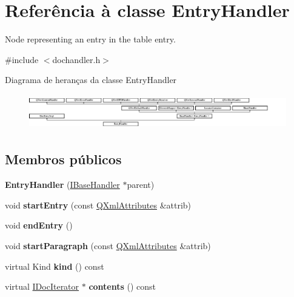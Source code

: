 \hypertarget{class_entry_handler}{\section{Referência à classe Entry\-Handler}
\label{class_entry_handler}
}


Node representing an entry in the table entry.  




{\ttfamily \#include $<$dochandler.\-h$>$}

Diagrama de heranças da classe Entry\-Handler\begin{figure}[H]
\begin{center}
\leavevmode
\includegraphics[height=1.545894cm]{class_entry_handler}
\end{center}
\end{figure}
\subsection*{Membros públicos}
\begin{DoxyCompactItemize}
\item 
\hypertarget{class_entry_handler_acb087cca1ea9e2026162c18aa7c028ca}{{\bfseries Entry\-Handler} (\hyperlink{class_i_base_handler}{I\-Base\-Handler} $\ast$parent)}\label{class_entry_handler_acb087cca1ea9e2026162c18aa7c028ca}

\item 
\hypertarget{class_entry_handler_ac235cd02462379ae5f73c64fa4141c50}{void {\bfseries start\-Entry} (const \hyperlink{class_q_xml_attributes}{Q\-Xml\-Attributes} \&attrib)}\label{class_entry_handler_ac235cd02462379ae5f73c64fa4141c50}

\item 
\hypertarget{class_entry_handler_a55ff6789223e054ec7aebc9e893dc7b3}{void {\bfseries end\-Entry} ()}\label{class_entry_handler_a55ff6789223e054ec7aebc9e893dc7b3}

\item 
\hypertarget{class_entry_handler_abb7f955561480002949ada58092c1964}{void {\bfseries start\-Paragraph} (const \hyperlink{class_q_xml_attributes}{Q\-Xml\-Attributes} \&attrib)}\label{class_entry_handler_abb7f955561480002949ada58092c1964}

\item 
\hypertarget{class_entry_handler_af8e62c8a81ddf2283205cc8955de50eb}{virtual Kind {\bfseries kind} () const }\label{class_entry_handler_af8e62c8a81ddf2283205cc8955de50eb}

\item 
\hypertarget{class_entry_handler_a6f867db5d47aa2210c77df9bc5953008}{virtual \hyperlink{class_i_doc_iterator}{I\-Doc\-Iterator} $\ast$ {\bfseries contents} () const }\label{class_entry_handler_a6f867db5d47aa2210c77df9bc5953008}

\end{DoxyCompactItemize}
